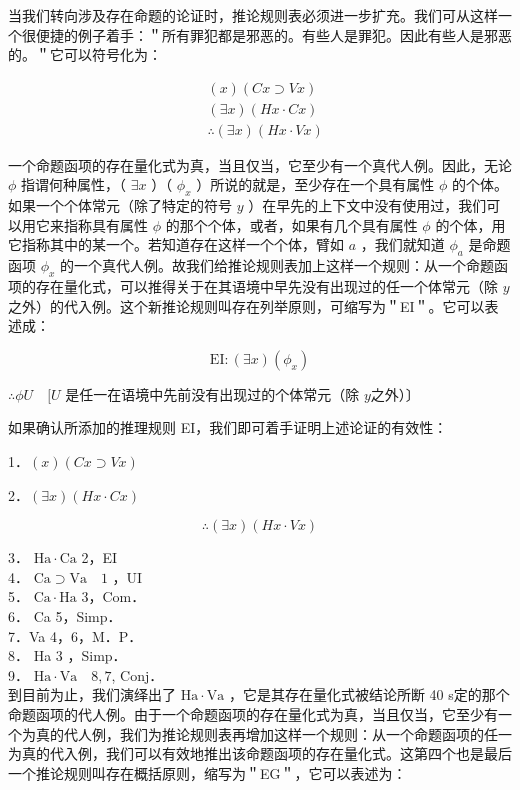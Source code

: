 当我们转向涉及存在命题的论证时，推论规则表必须进一步扩充。我们可从这样一个很便捷的例子着手：＂所有罪犯都是邪恶的。有些人是罪犯。因此有些人是邪恶的。＂它可以符号化为：

$$
\begin{aligned}
& (x)(C x \supset V x) \\
& (\exists x)(H x \cdot C x) \\
& \therefore(\exists x)(H x \cdot V x)
\end{aligned}
$$

一个命题函项的存在量化式为真，当且仅当，它至少有一个真代人例。因此，无论 $\phi$ 指谓何种属性，（ $\exists x$ ）（ $\phi_{x}$ ）所说的就是，至少存在一个具有属性 $\phi$ 的个体。如果一个个体常元（除了特定的符号 $y$ ）在早先的上下文中没有使用过，我们可以用它来指称具有属性 $\phi$ 的那个个体，或者，如果有几个具有属性 $\phi$ 的个体，用它指称其中的某一个。若知道存在这样一个个体，臂如 $a$ ，我们就知道 $\phi_{a}$ 是命题函项 $\phi_{x}$ 的一个真代人例。故我们给推论规则表加上这样一个规则：从一个命题函项的存在量化式，可以推得关于在其语境中早先没有出现过的任一个体常元（除 $y$ 之外）的代入例。这个新推论规则叫存在列举原则，可缩写为＂EI＂。它可以表述成：

$$
\mathrm{EI}:(\exists x)\left(\phi_{x}\right)
$$

$\therefore \phi U \quad[U$ 是任一在语境中先前没有出现过的个体常元（除 $y$之外）〕

如果确认所添加的推理规则 EI，我们即可着手证明上述论证的有效性：

1．$(x)(C x \supset V x)$

2．$(\exists x)(H x \cdot C x)$

$$
\therefore(\exists x)(H x \cdot V x)
$$

3． $\mathrm{Ha} \cdot \mathrm{Ca}$ 2，EI\\
4． $\mathrm{Ca} \supset \mathrm{Va} \quad 1$ ，UI\\
5． $\mathrm{Ca} \cdot \mathrm{Ha}$ 3，Com．\\
6． Ca 5，Simp．\\
7．Va 4，6，M．P．\\
8． Ha 3 ，Simp．\\
9． $\mathrm{Ha} \cdot \mathrm{Va} \quad 8,7$, Conj．\\
到目前为止，我们演绎出了 $\mathrm{Ha} \cdot \mathrm{Va}$ ，它是其存在量化式被结论所断 40 s定的那个命题函项的代人例。由于一个命题函项的存在量化式为真，当且仅当，它至少有一个为真的代人例，我们为推论规则表再增加这样一个规则：从一个命题函项的任一为真的代入例，我们可以有效地推出该命题函项的存在量化式。这第四个也是最后一个推论规则叫存在概括原则，缩写为＂EG＂，它可以表述为：

